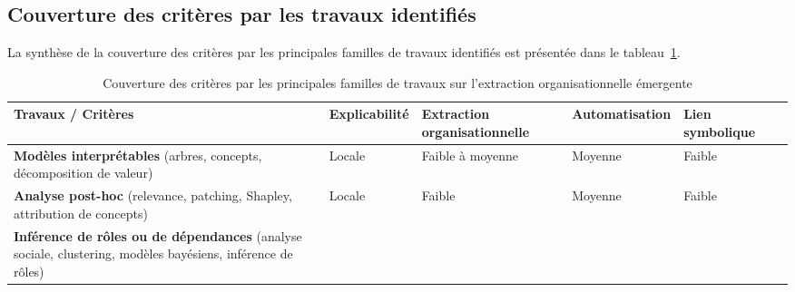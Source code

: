 \subsection*{Couverture des critères par les travaux identifiés}

La synthèse de la couverture des critères par les principales familles de travaux identifiés est présentée dans le tableau~\ref{tab:couverture_criteres_travaux_anl}.

\begin{table}[h!]
    \centering
    \caption{Couverture des critères par les principales familles de travaux sur l’extraction organisationnelle émergente}
    \label{tab:couverture_criteres_travaux_anl}
    \scriptsize
    \renewcommand{\arraystretch}{1.4}
    \begin{tabular}{p{4cm}p{1.7cm}p{2.3cm}p{1.7cm}p{1.7cm}p{1.7cm}}
        \hline
        \textbf{Travaux / Critères} & \textbf{Explicabilité} & \textbf{Extraction organisationnelle} & \textbf{Automatisation} & \textbf{Lien symbolique} \\
        \hline
        \textbf{Modèles interprétables} \newline
        (arbres, concepts, décomposition de valeur) \newline
        \cite{zhang2024advancing, milani2022maviper, milani2024interpretable, zabounidis2023concept, liu2025, iturria2024explainable, li2025from}
                                    & Locale
                                    & Faible à moyenne
                                    & Moyenne
                                    & Faible                                                                                                              \\
        \textbf{Analyse post-hoc} \newline
        (relevance, patching, Shapley, attribution de concepts) \newline
        \cite{grupen2022concept, poupart2025perspectives, li2025from}
                                    & Locale
                                    & Faible
                                    & Moyenne
                                    & Faible                                                                                                              \\
        \textbf{Inférence de rôles ou de dépendances} \newline
        (analyse sociale, clustering, modèles bayésiens, inférence de rôles) \newline

\end{tabular}
\end{table}
